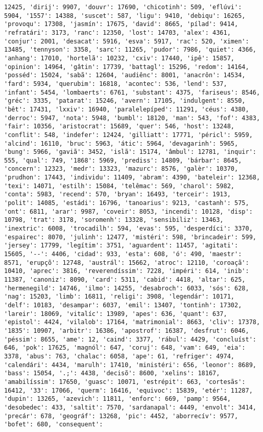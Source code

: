 \documentclass[11pt]{article}
\begin{document}
\begin{Verbatim}[commandchars=\\\{\}]
12425, 'dirij': 9907, 'douvr': 17690, 'chicotinh': 509, 'eflúvi': 5904, '1557': 14388, 'suscet': 587, 'ligu': 9410, 'debiqu': 16265, 'provoqu': 17308, 'jasmín': 17675, 'david': 8665, 'pílad': 9414, 'refratári': 3173, 'ranc': 12350, 'lost': 14703, 'alex': 4361, 'conjur': 2001, 'desacat': 5916, 'esva': 5917, 'rac': 520, 'ximen': 13485, 'tennyson': 3358, 'sarc': 11265, 'pudor': 7986, 'quiet': 4366, 'anhang': 17010, 'hortelã': 10232, 'cxiv': 17440, 'ipê': 15857, 'opinion': 14964, 'gâtin': 17739, 'battagl': 15296, 'redom': 14164, 'posséd': 15024, 'sabã': 12604, 'audiênc': 8001, 'anacrôn': 14534, 'fard': 5934, 'querubim': 16818, 'acontec': 536, 'lend': 537, 'infant': 5454, 'lombaerts': 6761, 'substant': 4375, 'fariseus': 8546, 'gréc': 3335, 'patarat': 15246, 'avern': 17105, 'indulgent': 8550, 'bêt': 17431, 'lxxiv': 16940, 'paralelepíped': 11291, 'céus': 4380, 'derroc': 5947, 'nota': 5948, 'bumbl': 18120, 'man': 543, 'fof': 4383, 'fair': 10356, 'aristocrat': 15689, 'quer': 546, 'host': 13248, 'conflit': 548, 'indefer': 12424, 'gilliatt': 17771, 'péricl': 5959, 'alcind': 16110, 'bruc': 5963, 'átic': 5964, 'devagarinh': 5965, 'bung': 5966, 'gaviã': 3452, 'islã': 15174, 'âmbul': 12781, 'inquir': 555, 'qual': 749, '1868': 5969, 'prediss': 14809, 'bárbar': 8645, 'concern': 12323, 'medr': 13323, 'mazurc': 8576, 'galèr': 10370, 'prudhon': 17443, 'individu': 11409, 'abram': 4390, 'bateleir': 12368, 'texi': 14071, 'estilh': 15084, 'telêmac': 569, 'charol': 5982, 'conta': 5983, 'recend': 570, 'bryan': 16493, 'terceir': 1913, 'polit': 14085, 'estádi': 16796, 'tanoarius': 9213, 'castanh': 575, 'ont': 6811, 'arar': 9987, 'coveir': 8053, 'incendi': 10128, 'disp': 10798, 'trat': 3178, 'soromenh': 13328, 'sensibiliz': 13463, 'inextric': 6008, 'trocadilh': 594, 'evas': 595, 'desperdíci': 3370, 'espairec': 8070, 'julinh': 12477, 'mistéri': 598, 'brincadeir': 599, 'jersey': 17799, 'legítim': 3751, 'aguardent': 11457, 'agitati': 15605, '--': 4406, 'cidad': 933, 'esta': 608, 'ó': 490, 'maestr': 8571, 'erupçõ': 12748, 'austrál': 15662, 'atroc': 12110, 'coroaçã': 10410, 'aprec': 3816, 'reverendíssim': 7228, 'impéri': 614, 'inib': 11387, 'canoniz': 8090, 'card': 5311, 'cabid': 4418, 'altar': 625, 'hermenegild': 14746, 'ilmo': 14255, 'desabroch': 6033, 'sós': 628, 'nag': 15203, 'limb': 16811, 'religi': 3908, 'legendár': 10171, 'delf': 10183, 'desampar': 6037, 'emil': 13407, 'tontinh': 17302, 'lareir': 18069, 'vitalíc': 13989, 'apes': 636, 'quant': 637, 'epistol': 4424, 'vilalob': 17164, 'matrimonial': 8663, 'cliv': 17378, '1835': 10907, 'arbitr': 16386, 'apostrof': 16387, 'desfrut': 6046, 'péssim': 8655, 'ame': 12, 'caind': 3377, 'rábul': 4429, 'concluíst': 646, 'pok': 17625, 'magnól': 647, 'coruj': 648, 'vam': 649, 'eia': 3378, 'abus': 763, 'chalac': 6058, 'ape': 61, 'refriger': 4974, 'calendári': 4434, 'marulh': 17410, 'ministéri': 656, 'leonor': 8689, 'bass': 15054, '.;': 4438, 'decisõ': 8600, 'xelins': 18167, 'amabilíssim': 17650, 'guasc': 10071, 'estrépit': 663, 'cortesãs': 16412, '33': 17066, 'querm': 16416, 'equivoc': 15839, 'etér': 11287, 'dupin': 13265, 'azevich': 11811, 'enforc': 669, 'pamp': 9564, 'desobedec': 433, 'saltit': 7570, 'sardanapal': 4449, 'envolt': 3414, 'precár': 678, 'geográf': 13268, 'pic': 4452, 'aborrecív': 9577, 'bofet': 680, 'consequent': 
\end{Verbatim}
\end{document}
